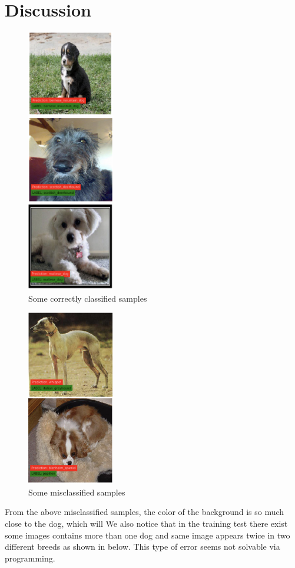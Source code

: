 \documentclass{article}
\begin{document}
\section{Discussion}
\begin{figure}[H]
	\centering
	\includegraphics[width=1.5in]{pics/correct_samples} 
	\caption{Some correctly classified samples}
\end{figure}
\begin{figure}[H]
	\centering
	\includegraphics[width=1.5in]{pics/wrong_samples} 
	\caption{Some misclassified samples}
	
\end{figure}
From the above misclassified samples, the color of the background is so much close to the dog, which will  We also notice that in the training test there exist some images contains more than one dog and same image appears twice in two different breeds as shown in below. This type of error seems not solvable via programming. 
\end{document}
